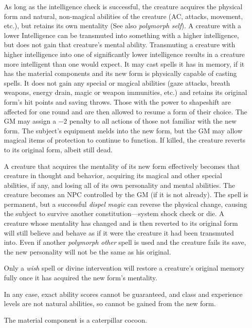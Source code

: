 \begin{multicols}{2}
As long as the intelligence check is successful, the creature acquires the physical form and natural, non-magical abilities of the creature (AC, attacks, movement, etc.), but retains its own mentality (See also \textit{polymorph self}).  A creature with a lower Intelligence can be transmuted into something with a higher intelligence, but does not gain that creature's mental ability.  Transmuting a creature with higher intelligence into one of significantly lower intelligence results in a creature more intelligent than one would expect.  It may cast spells it has in memory, if it has the material components and its new form is physically capable of casting spells.  It does not gain any special or magical abilities (gaze attacks, breath weapons, energy drain, magic or weapon immunities, etc.) and retains its original form's hit points and saving throws.  Those with the power to shapeshift are affected for one round and are then allowed to resume a form of their choice.  The GM may assign a $-2$ penalty to all actions of those not familiar with the new form.  The subject's equipment melds into the new form, but the GM may allow magical items of protection to continue to function.  If killed, the creature reverts to its original form, albeit still dead.  

A creature that acquires the mentality of its new form effectively becomes that creature in thought and behavior, acquiring its magical and other special abilities, if any, and losing all of its own personality and mental abilities.  The creature becomes an NPC controlled by the GM (if it is not already).  The spell is permanent, but a successful \textit{dispel magic} can reverse the physical change, causing the subject to survive another constitution---system shock check or die.  A creature whose mentality has changed and is then reverted to its original form will still believe and behave as if it were the creature it had been transmuted into.  Even if another \textit{polymorph other} spell is used and the creature fails its save, the new personality will not be the same as his original.  

Only a \textit{wish} spell or divine intervention will restore a creature's original memory fully once it has acquired the new form's mentality.

In any case, exact ability scores cannot be guaranteed, and class and experience levels are not natural abilities, so cannot be gained from the new form.

The material component is a caterpillar cocoon.


\end{multicols}
